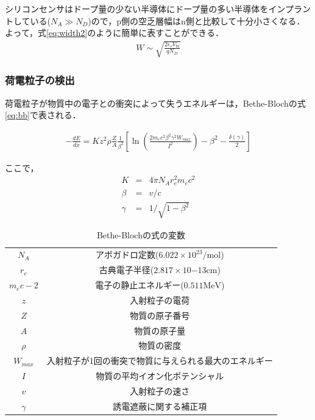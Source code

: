 シリコンセンサはドープ量の少ない半導体にドープ量の多い半導体をインプラントしている($N_A \gg N_D$)ので，p側の空乏層幅はn側と比較して十分小さくなる．よって，式\ref{eq:width2}のように簡単に表すことができる．
\begin{eqnarray}
  \label{eq:width2}
  W \sim \sqrt{ \frac{2\epsilon_s V_{\mathrm{bi}}}{q N_D} }
\end{eqnarray}

\subsubsection*{荷電粒子の検出}
荷電粒子が物質中の電子との衝突によって失うエネルギーは，Bethe-Blochの式\ref{eq:bb}で表される．\par
\begin{eqnarray}
  \label{eq:bb}
  - \frac{dE}{dx} = K z^2 \rho \frac{Z}{A} \frac{1}{\beta^2} \left[ \ln \left( \frac{2m_e c^2 \beta^2 \gamma^2 W_{max}}{I^2} \right) - \beta^2 - \frac{\delta(\gamma)}{2} \right]
\end{eqnarray}

ここで，
\begin{eqnarray}
  K &=& 4\pi N_A r^2_e m_e c^2 \nonumber \\
  \beta &=& v/c \nonumber \\
  \gamma &=& 1/\sqrt{1-\beta^2} \nonumber
\end{eqnarray}


\begin{table}[h]
  \centering
  \caption{Bethe-Blochの式の変数}
  \label{tab:bethe}
  \begin{tabular}{cc} \hline
    $N_A$ & アボガドロ定数($6.022 \times 10^{23} \mathrm{/mol}$)\\
    $r_e$ & 古典電子半径($2.817 \times 10{-13} \mathrm{cm}$)\\
    $m_e c-2$ & 電子の静止エネルギー($0.511 \mathrm{MeV}$)\\
    $z$ & 入射粒子の電荷\\
    $Z$ & 物質の原子番号\\
    $A$ & 物質の原子量\\
    $\rho$ & 物質の密度\\
    $W_{max}$ & 入射粒子が1回の衝突で物質に与えられる最大のエネルギー\\
    $I$ & 物質の平均イオン化ポテンシャル\\
    $v$ & 入射粒子の速さ\\
    $\gamma$ & 誘電遮蔽に関する補正項\\ \hline
  \end{tabular}
\end{table}


